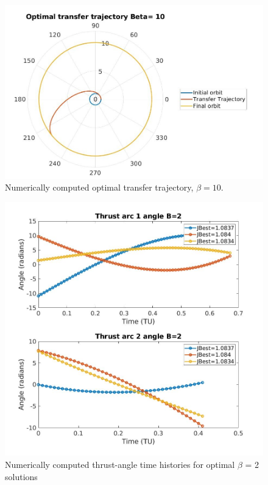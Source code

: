   \begin{figure}[H]
    \includegraphics[width=\linewidth]{./jpgs/thrustArcB10.jpg}
    \caption{Numerically computed optimal transfer trajectory, $\beta = 10$.}
    \label{fig:Tarc-B10}
  \end{figure}



\begin{figure}[H]
\includegraphics[width=\linewidth]{./jpgs/thrustAnglesB2.jpg}
\caption{Numerically computed thrust-angle time histories for optimal $\beta$ = 2 solutions  }
\label{fig:thrustAnglesB2}
\end{figure}

